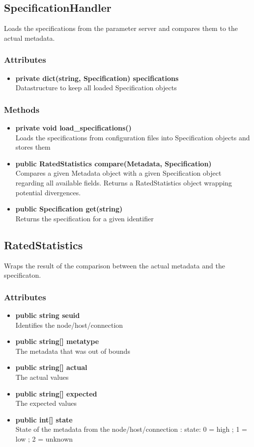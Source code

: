 \subsection{SpecificationHandler}
Loads the specifications from the parameter server and compares them to the actual metadata.

\subsubsection{Attributes}
\begin{itemize}
	\item \textbf{private dict(string, Specification) specifications}\\
	Datastructure to keep all loaded Specification objects
\end{itemize}
\subsubsection{Methods}
\begin{itemize}
	\item \textbf{private void load\_specifications()}\\
	Loads the specifications from configuration files into Specification objects and stores them
	\item \textbf{public RatedStatistics compare(Metadata, Specification)}\\
	Compares a given Metadata object with a given Specification object regarding all available fields. Returns a RatedStatistics object wrapping potential divergences.
	\item \textbf{public Specification get(string)}\\
	Returns the specification for a given identifier
\end{itemize}


\subsection{RatedStatistics}
Wraps the result of the comparison between the actual metadata and the specificaton.

\subsubsection{Attributes}
\begin{itemize}
	\item \textbf{public string seuid}\\
	Identifies the node/host/connection
	\item \textbf{public string[] metatype}\\
	The metadata that was out of bounds
	\item \textbf{public string[] actual}\\
	The actual values
	\item \textbf{public string[] expected}\\
	The expected values
	\item \textbf{public int[] state}\\
	State of the metadata from the node/host/connection : state: { 0 = high ; 1 = low ; 2 = unknown}
\end{itemize}


